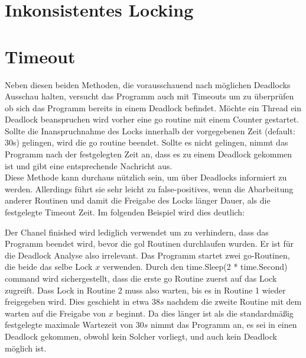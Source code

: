 \section{Inkonsistentes Locking}

\section{Timeout}
Neben diesen beiden Methoden, die vorausschauend nach möglichen Deadlocks 
Ausschau halten, versucht das Programm auch mit Timeouts um zu überprüfen ob 
sich das Programm bereits in einem Deadlock befindet. Möchte ein Thread ein 
Deadlock beanspruchen wird vorher eine go routine mit einem Counter gestartet.
Sollte die Inanspruchnahme des Locks innerhalb der vorgegebenen Zeit 
(default: 30s) gelingen, wird die go routine beendet. Sollte es nicht gelingen,
nimmt das Programm nach der festgelegten Zeit an, dass es zu einem Deadlock 
gekommen ist und gibt eine entsprechende Nachricht aus.\\
Diese Methode kann
durchaus nützlich sein, um über Deadlocks informiert zu werden. Allerdings führt
sie sehr leicht zu false-positives, wenn die Abarbeitung anderer Routinen und 
damit die Freigabe des Locks länger Dauer, als die festgelegte Timeout Zeit.
Im folgenden Beispiel wird dies deutlich:
\begin{figure}[H]
    
\end{figure}
Der Chanel finished wird lediglich verwendet um zu verhindern, dass das Programm 
beendet wird, bevor die gol Routinen durchlaufen wurden. Er ist für die Deadlock
Analyse also irrelevant. Das Programm startet zwei go-Routinen, die beide das 
selbe Lock $x$ verwenden. Durch den time.Sleep(2 * time.Second) command wird 
sichergestellt, dass die erste go Routine zuerst auf das Lock zugreift. 
Dass Lock in Routine 2 muss also warten, bis es in Routine 1 wieder freigegeben
wird. Dies geschieht in etwa $38 s$ nachdem die zweite Routine mit dem warten 
auf die Freigabe von $x$ beginnt. Da dies länger ist als die standardmäßig
festgelegte maximale Wartezeit von $30 s$ nimmt das Programm an, es sei in einen 
Deadlock gekommen, obwohl kein Solcher vorliegt, und auch kein Deadlock möglich 
ist.


